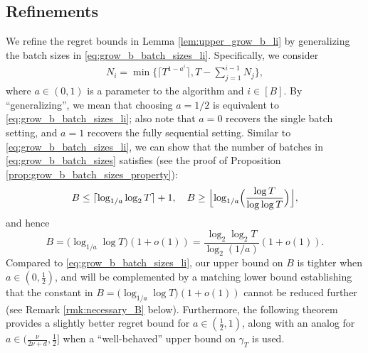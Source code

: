 \documentclass[10pt]{article}
\begin{document}
\subsection{Refinements}
We refine the regret bounds in Lemma \ref{lem:upper_grow_b_li} by generalizing the batch sizes in \eqref{eq:grow_b_batch_sizes_li}. Specifically, we consider
\begin{align}
    N_i = \min \biggl\{\lceil T^{1-a^i} \rceil, T-\sum_{j=1}^{i-1}N_j\biggr\}, \label{eq:grow_b_batch_sizes}
\end{align}
where $a\in(0,1)$ is a parameter to the algorithm and $i\in[B]$. By ``generalizing'', we mean that choosing $a = 1/2$ is equivalent to \eqref{eq:grow_b_batch_sizes_li}; also note that $a=0$ recovers the single batch setting, and $a=1$ recovers the fully sequential setting. 
Similar to \eqref{eq:grow_b_batch_sizes_li}, we can show that the number of batches in \eqref{eq:grow_b_batch_sizes} satisfies (see the proof of Proposition \ref{prop:grow_b_batch_sizes_property}):
\begin{align}
    B \leq \lceil \log_{1/a}\log_2 T \rceil + 1, \quad  
    B  \geq \Bigl\lfloor \log_{1/a}\Bigl(\frac{\log T}{\log\log T}\Bigr) \Bigr\rfloor, \label{eq:B_upper}
\end{align}
and hence 
\begin{equation}
    B = \bigl(\log_{1/a}\log T\bigr) (1+o(1)) = \frac{\log_2\log_2 T}{\log_2(1/a)}(1+o(1)). \label{eq:B_asymp}
\end{equation}
Compared to \eqref{eq:grow_b_batch_sizes_li}, our upper bound on $B$ is tighter when $a \in (0,\frac{1}{2})$, and will be complemented by a matching lower bound establishing that the constant in $B = \bigl(\log_{1/a}\log T\bigr) (1+o(1))$ cannot be reduced further (see Remark \ref{rmk:necessary_B} below). 
Furthermore, the following theorem provides a slightly better regret bound for $a\in (\frac{1}{2}, 1)$, along with an analog for $a\in(\frac{\nu}{2\nu+d},\frac{1}{2}]$ when a ``well-behaved'' upper bound on $\gamma_T$ is used.
\end{document}
